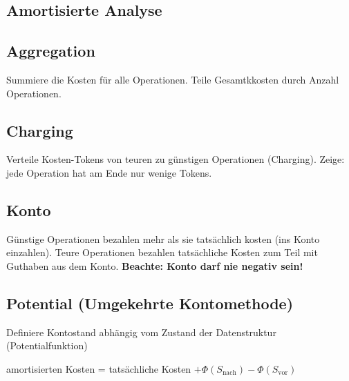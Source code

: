 \documentclass[11pt, a4paper, twoside]{article}
\begin{document}
\begin{multicols}{2}
    \columnbreak
    \section{Amortisierte Analyse}

    \subsection{Aggregation}
    Summiere die Kosten für alle Operationen. Teile Gesamtkkosten durch Anzahl
    Operationen. 

    \subsection{Charging}
    Verteile Kosten-Tokens von teuren zu günstigen Operationen (Charging). Zeige:
    jede Operation hat am Ende nur wenige Tokens. 

    \subsection{Konto}
    Günstige Operationen bezahlen mehr als sie tatsächlich kosten (ins Konto
    einzahlen). Teure Operationen bezahlen tatsächliche Kosten zum Teil mit
    Guthaben aus dem Konto. \textbf{Beachte: Konto darf nie negativ sein!}

    \subsection{Potential (Umgekehrte Kontomethode)}
    Definiere Kontostand abhängig vom Zustand der Datenstruktur
    (Potentialfunktion)

    amortisierten Kosten = tatsächliche Kosten 
    $+ \Phi(S_\text{nach}) -\Phi(S_\text{vor})$

\end{multicols}
\end{document}
